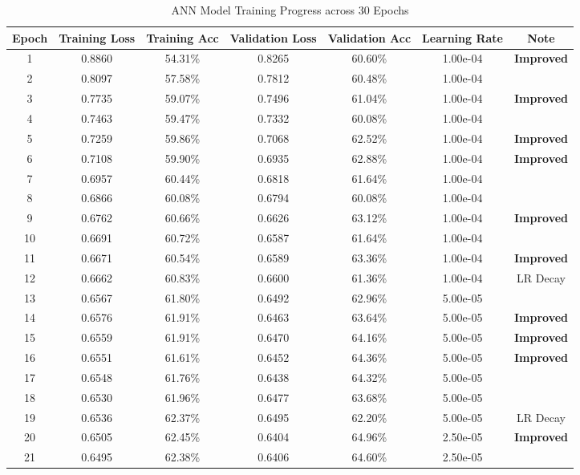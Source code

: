 \documentclass[12pt,a4paper]{article}
\begin{document}
\begin{table}[H]
\centering
\caption{ANN Model Training Progress across 30 Epochs}
\label{tab:ann_training_progress}
\begin{small}
\begin{tabular}{ccccccc}
\toprule
Epoch & Training Loss & Training Acc & Validation Loss & Validation Acc & Learning Rate & Note \\
\midrule
1 & 0.8860 & 54.31\% & 0.8265 & 60.60\% & 1.00e-04 & \textbf{Improved} \\
2 & 0.8097 & 57.58\% & 0.7812 & 60.48\% & 1.00e-04 &  \\
3 & 0.7735 & 59.07\% & 0.7496 & 61.04\% & 1.00e-04 & \textbf{Improved} \\
4 & 0.7463 & 59.47\% & 0.7332 & 60.08\% & 1.00e-04 &  \\
5 & 0.7259 & 59.86\% & 0.7068 & 62.52\% & 1.00e-04 & \textbf{Improved} \\
6 & 0.7108 & 59.90\% & 0.6935 & 62.88\% & 1.00e-04 & \textbf{Improved} \\
7 & 0.6957 & 60.44\% & 0.6818 & 61.64\% & 1.00e-04 &  \\
8 & 0.6866 & 60.08\% & 0.6794 & 60.08\% & 1.00e-04 &  \\
9 & 0.6762 & 60.66\% & 0.6626 & 63.12\% & 1.00e-04 & \textbf{Improved} \\
10 & 0.6691 & 60.72\% & 0.6587 & 61.64\% & 1.00e-04 &  \\
11 & 0.6671 & 60.54\% & 0.6589 & 63.36\% & 1.00e-04 & \textbf{Improved} \\
12 & 0.6662 & 60.83\% & 0.6600 & 61.36\% & 1.00e-04 & LR Decay \\
13 & 0.6567 & 61.80\% & 0.6492 & 62.96\% & 5.00e-05 &  \\
14 & 0.6576 & 61.91\% & 0.6463 & 63.64\% & 5.00e-05 & \textbf{Improved} \\
15 & 0.6559 & 61.91\% & 0.6470 & 64.16\% & 5.00e-05 & \textbf{Improved} \\
16 & 0.6551 & 61.61\% & 0.6452 & 64.36\% & 5.00e-05 & \textbf{Improved} \\
17 & 0.6548 & 61.76\% & 0.6438 & 64.32\% & 5.00e-05 &  \\
18 & 0.6530 & 61.96\% & 0.6477 & 63.68\% & 5.00e-05 &  \\
19 & 0.6536 & 62.37\% & 0.6495 & 62.20\% & 5.00e-05 & LR Decay \\
20 & 0.6505 & 62.45\% & 0.6404 & 64.96\% & 2.50e-05 & \textbf{Improved} \\
21 & 0.6495 & 62.38\% & 0.6406 & 64.60\% & 2.50e-05 &  \\

\end{tabular}
\end{small}
\end{table}
\end{document}
